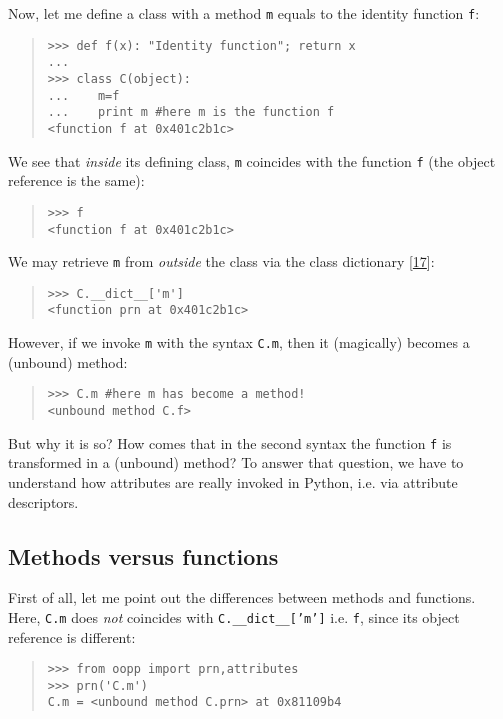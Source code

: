 \documentclass[10pt,english]{article}
\begin{document}
Now, let me define a class with a method \texttt{m} equals to the identity
function \texttt{f}:
\begin{quote}
\begin{verbatim}>>> def f(x): "Identity function"; return x
...
>>> class C(object):
...    m=f
...    print m #here m is the function f
<function f at 0x401c2b1c>\end{verbatim}
\end{quote}

We see that \emph{inside} its defining class, \texttt{m} coincides with the function 
\texttt{f} (the object reference is the same):
\begin{quote}
\begin{verbatim}>>> f
<function f at 0x401c2b1c>\end{verbatim}
\end{quote}

We may retrieve \texttt{m} from \emph{outside} the class via the class dictionary [\hyperlink{id34}{17}]:
\begin{quote}
\begin{verbatim}>>> C.__dict__['m']
<function prn at 0x401c2b1c>\end{verbatim}
\end{quote}

However, if we invoke \texttt{m} with
the syntax \texttt{C.m}, then it (magically) becomes a (unbound) method:
\begin{quote}
\begin{verbatim}>>> C.m #here m has become a method!
<unbound method C.f>\end{verbatim}
\end{quote}

But why it is so? How comes that in the second syntax the function 
\texttt{f} is transformed in a (unbound) method? To answer that question, we have
to understand how attributes are really invoked in Python, i.e. via
attribute descriptors.



\hypertarget{methods-versus-functions}{}
\subsection*{Methods versus functions}

First of all, let me point out the differences between methods and
functions. Here, \texttt{C.m} does \emph{not} coincides with \texttt{C.{\_}{\_}dict{\_}{\_}['m']}
i.e. \texttt{f}, since its object reference is different:
\begin{quote}
\begin{verbatim}>>> from oopp import prn,attributes
>>> prn('C.m')
C.m = <unbound method C.prn> at 0x81109b4\end{verbatim}
\end{quote}
\end{document}
